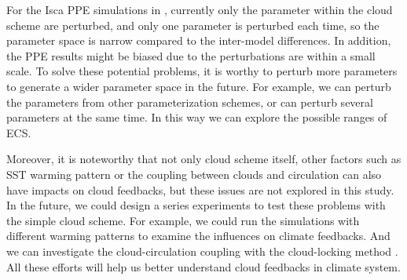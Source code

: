 For the Isca PPE simulations in , currently only the parameter within the cloud scheme are perturbed, and only one parameter is perturbed each time, so the parameter space is narrow compared to the inter-model differences. In addition, the PPE results might be biased due to the perturbations are within a small scale. To solve these potential problems, it is worthy to perturb more parameters to generate a wider parameter space in the future. For example, we can perturb the parameters from other parameterization schemes, or can perturb several parameters at the same time. In this way we can explore the possible ranges of ECS.

Moreover, it is noteworthy that not only cloud scheme itself, other factors such as SST warming pattern \citep[e.g.,][]{Zhou2016,Dong2019attributing,Dong2020intermodel} or the coupling between clouds and circulation \citep[e.g.,][]{Bony2004,Vial2013} can also have impacts on cloud feedbacks, but these issues are not explored in this study. In the future, we could design a series experiments to test these problems with the simple cloud scheme. For example, we could run the simulations with different warming patterns to examine the influences on climate feedbacks. And we can investigate the cloud-circulation coupling with the cloud-locking method \citep[e.g.,][]{Voigt2020review}. All these efforts will help us better understand cloud feedbacks in climate system.


%
%

%
